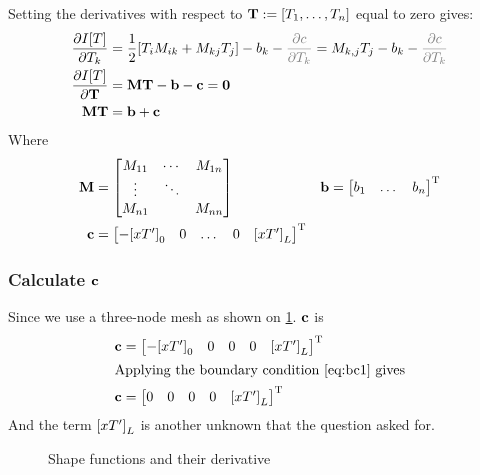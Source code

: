 Setting the derivatives with respect to $\mathbf{T} := [T_1, \dotsc , T_{n}]$ equal to
zero gives:
\newcommand{\pFrac}[2]{\ensuremath{\frac{\partial #1}{\partial #2}}}
\newcommand{\pcTk}{\ensuremath{\cld{\pFrac{c}{T_k}}}}
\begin{align}
 \pFrac{I[T]}{T_k} &= \frac{1}{2}[T_i M_{ik} + M_{kj}T_j] - b_k - \pcTk
                                       = M_{k,j}T_j - b_k - \pcTk \notag\\
  \frac{\partial I[T]}{\partial \T }
                   &= \M\T - \b - \c= \mathbf{0} \notag\\
  \M \T &= \b + \c \label{eq:mtb}
\end{align}
Where
\newcommand{\tsps}[1]{\ensuremath{{#1}^{\text{T}}}}
\newenvironment{tbmatrix}{\begin{bmatrix}}{\end{bmatrix}^{\text{T}}}
\begin{align*}
  \M &=
       \begin{bmatrix}
         M_{11} & \cdots& M_{1n}\\
         \vdots& \ddots &\\
         M_{n1}&& M_{nn} \\
       \end{bmatrix} &
                       \b &=
                            \begin{tbmatrix}
                              b_1 & \dotsc & b_n
                            \end{tbmatrix} \\
  \c &=\begin{tbmatrix}
    -\eBdri{0} & 0 & \dotsc & 0 & \eBdri{L}
       \end{tbmatrix}
\end{align*}

\subsubsection*{Calculate $\mathbf{c}$}
Since we use a three-node mesh as shown on \cref{fig:shpfuncs}. $\mathbf{c}$ is
\begin{align}
  \c &=\begin{tbmatrix}
    -\eBdri{0}&0&0&0& \eBdri{L}
  \end{tbmatrix}
                      \notag\\
  \intertext{Applying the boundary condition \cref{eq:bc1} gives}
  \c &=\begin{tbmatrix}
    0&0&0&0& \eBdri{L}
  \end{tbmatrix} \label{eq:bigc}
\end{align}
And the term ${[xT']}_{L}$ is another unknown that the question asked for.
\begin{figure}
  \centering
  
  \caption{Shape functions and their derivative}\label{fig:shpfuncs}
\end{figure}

